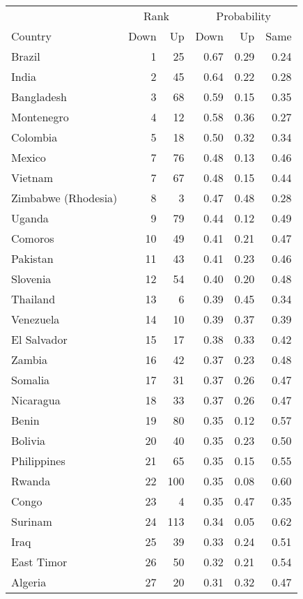 
\begin{longtable}[t]{lrrrrr}
\toprule
\multicolumn{1}{c}{ } & \multicolumn{2}{c}{Rank} & \multicolumn{3}{c}{Probability} \\
\cmidrule(l{3pt}r{3pt}){2-3} \cmidrule(l{3pt}r{3pt}){4-6}
Country & Down & Up & Down & Up & Same\\
\midrule
Brazil & 1 & 25 & 0.67 & 0.29 & 0.24\\
India & 2 & 45 & 0.64 & 0.22 & 0.28\\
Bangladesh & 3 & 68 & 0.59 & 0.15 & 0.35\\
Montenegro & 4 & 12 & 0.58 & 0.36 & 0.27\\
Colombia & 5 & 18 & 0.50 & 0.32 & 0.34\\
\addlinespace
Mexico & 7 & 76 & 0.48 & 0.13 & 0.46\\
Vietnam & 7 & 67 & 0.48 & 0.15 & 0.44\\
Zimbabwe (Rhodesia) & 8 & 3 & 0.47 & 0.48 & 0.28\\
Uganda & 9 & 79 & 0.44 & 0.12 & 0.49\\
Comoros & 10 & 49 & 0.41 & 0.21 & 0.47\\
\addlinespace
Pakistan & 11 & 43 & 0.41 & 0.23 & 0.46\\
Slovenia & 12 & 54 & 0.40 & 0.20 & 0.48\\
Thailand & 13 & 6 & 0.39 & 0.45 & 0.34\\
Venezuela & 14 & 10 & 0.39 & 0.37 & 0.39\\
El Salvador & 15 & 17 & 0.38 & 0.33 & 0.42\\
\addlinespace
Zambia & 16 & 42 & 0.37 & 0.23 & 0.48\\
Somalia & 17 & 31 & 0.37 & 0.26 & 0.47\\
Nicaragua & 18 & 33 & 0.37 & 0.26 & 0.47\\
Benin & 19 & 80 & 0.35 & 0.12 & 0.57\\
Bolivia & 20 & 40 & 0.35 & 0.23 & 0.50\\
\addlinespace
Philippines & 21 & 65 & 0.35 & 0.15 & 0.55\\
Rwanda & 22 & 100 & 0.35 & 0.08 & 0.60\\
Congo & 23 & 4 & 0.35 & 0.47 & 0.35\\
Surinam & 24 & 113 & 0.34 & 0.05 & 0.62\\
Iraq & 25 & 39 & 0.33 & 0.24 & 0.51\\
\addlinespace
East Timor & 26 & 50 & 0.32 & 0.21 & 0.54\\
Algeria & 27 & 20 & 0.31 & 0.32 & 0.47\\

\end{longtable}
